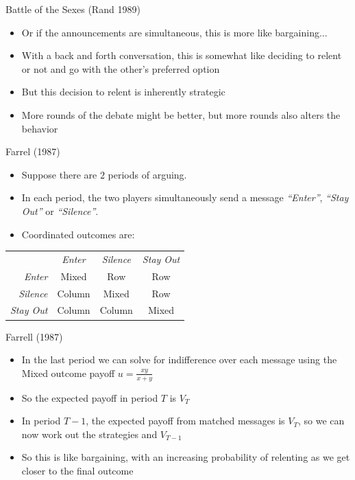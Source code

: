 \documentclass{beamer}
\begin{document}
\begin{frame}{Battle of the Sexes (Rand 1989)}
\begin{card}
	\begin{itemize}		
		\item Or if the announcements are simultaneous, this is more like bargaining...
		\item With a back and forth conversation, this is somewhat like deciding to relent or not and go with the other's preferred option
		\item But this decision to relent is inherently strategic
		\item More rounds of the debate might be better, but more rounds also alters the behavior
	\end{itemize}
\end{card}
\end{frame}

\begin{frame}{Farrel (1987)}
\begin{card}
	\begin{itemize}
		\item Suppose there are $2$ periods of arguing. 
		\item In each period, the two players simultaneously send a message \emph{``Enter''}, \emph{``Stay Out''} or \emph{``Silence''}.
		\item Coordinated outcomes are:
	\end{itemize}
	\begin{center}
		\begin{tabular}{r|c|c|c|}
				\multicolumn{1}{r}{}& \multicolumn{1}{c}{\emph{Enter}}  & \multicolumn{1}{c}{\emph{Silence}} & \multicolumn{1}{c}{\emph{Stay Out}}\\ \cline{2-4}
				\emph{Enter} &  Mixed & Row  & Row \\ \cline{2-4}
				\emph{Silence} &  Column & Mixed &  Row\\ \cline{2-4}
				\emph{Stay Out} &  Column & Column & Mixed  \\ \cline{2-4}
    	\end{tabular}
    \end{center}
\end{card}
\end{frame}

\begin{frame}{Farrell (1987)}
    \begin{card}
    	\begin{itemize}
    		\item In the last period we can solve for indifference over each message using the Mixed outcome payoff $u=\tfrac{xy}{x+y}$
    		\item So the expected payoff in period $T$ is $V_T$\pause
    		\item In period $T-1$, the expected payoff from matched messages is $V_T$, so we can now work out the strategies and $V_{T-1}$\pause
    		\item So this is like bargaining, with an increasing probability of relenting as we get closer to the final outcome
    	\end{itemize}
    \end{card}
\end{frame}
\end{document}
